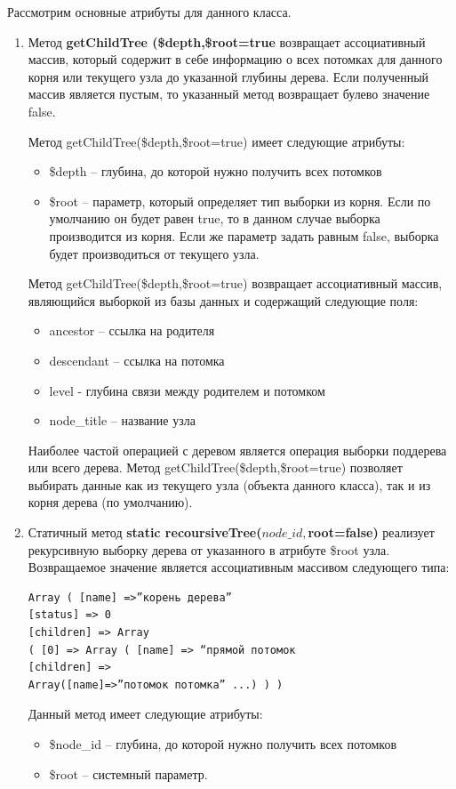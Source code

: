 \documentclass[a4paper,14pt]{extreport}
\theoremstyle{definition}
\begin{document}
Рассмотрим основные атрибуты для данного класса.
\begin{enumerate}

\item Метод \textbf{getChildTree (\$depth,\$root=true} возвращает ассоциативный массив, который содержит в себе информацию о всех потомках для данного корня или текущего узла до указанной глубины дерева. Если полученный массив является пустым, то указанный метод возвращает булево значение false.

Метод getChildTree(\$depth,\$root=true) имеет следующие атрибуты:
\begin{itemize}
\item \$depth – глубина, до которой нужно получить всех потомков
\item \$root – параметр, который определяет тип выборки из корня. Если по умолчанию он будет равен true, то в данном случае выборка производится из корня. Если же параметр задать равным false, выборка будет производиться от текущего узла.
\end{itemize}
Метод getChildTree(\$depth,\$root=true) возвращает ассоциативный массив, являющийся выборкой из базы данных и содержащий следующие поля:
\begin{itemize}
\item ancestor – ссылка на родителя
\item descendant – ссылка на потомка
\item level - глубина связи между родителем и потомком
\item node\_title – название узла
\end{itemize}
Наиболее частой операцией с деревом является операция выборки поддерева или всего дерева. Метод getChildTree(\$depth,\$root=true) позволяет выбирать данные как из текущего узла (объекта данного класса), так и из корня дерева (по умолчанию).

\item Статичный метод \textbf{static recoursiveTree($node\_id,$root=false)}
реализует рекурсивную выборку дерева от указанного в атрибуте \$root узла. Возвращаемое значение является ассоциативным массивом следующего типа:
\begin{verbatim}
Array ( [name] =>”корень дерева”
[status] => 0
[children] => Array
( [0] => Array ( [name] => “прямой потомок
[children] =>
Array([name]=>”потомок потомка” ...) ) )\end{verbatim}
Данный метод имеет следующие атрибуты:
\begin{itemize}
\item \$node\_id – глубина, до которой нужно получить всех потомков
\item \$root – системный параметр.
\end{itemize}


\end{enumerate}
\end{document}
